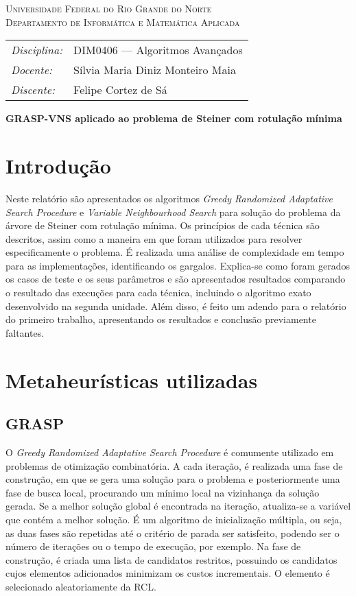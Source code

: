 \documentclass[12pt, a4paper]{article}
\begin{document}
\begin{center}
    \textsc{Universidade Federal do Rio Grande do Norte} \\
    \textsc{Departamento de Informática e Matemática Aplicada}
\end{center}

\bigskip

\begin{tabular}{@{}ll@{}}
    \emph{Disciplina:} & DIM0406 --- Algoritmos Avançados \\
    \emph{Docente:}    & Sílvia Maria Diniz Monteiro Maia \\
    \emph{Discente:}   & Felipe Cortez de Sá \\
\end{tabular}

\bigskip

\begin{center}
\large \textbf{GRASP-VNS aplicado ao problema de Steiner com rotulação mínima}
\end{center}

\section{Introdução}
Neste relatório são apresentados os algoritmos \emph{Greedy Randomized
Adaptative Search Procedure} e \emph{Variable Neighbourhood Search} para
solução do problema da árvore de Steiner com rotulação mínima. Os princípios de
cada técnica são descritos, assim como a maneira em que foram utilizados para
resolver especificamente o problema. É realizada uma análise de complexidade em
tempo para as implementações, identificando os gargalos. Explica-se como foram
gerados os casos de teste e os seus parâmetros e são apresentados resultados
comparando o resultado das execuções para cada técnica, incluindo o algoritmo
exato desenvolvido na segunda unidade. Além disso, é feito um adendo para o
relatório do primeiro trabalho, apresentando os resultados e conclusão
previamente faltantes.

\section{Metaheurísticas utilizadas}
\subsection{GRASP}
O \emph{Greedy Randomized Adaptative Search Procedure} é comumente utilizado em
problemas de otimização combinatória. A cada iteração, é realizada uma fase de
construção, em que se gera uma solução para o problema e posteriormente uma
fase de busca local, procurando um mínimo local na vizinhança da solução
gerada. Se a melhor solução global é encontrada na iteração, atualiza-se a
variável que contém a melhor solução. É um algoritmo de inicialização múltipla,
ou seja, as duas fases são repetidas até o critério de parada ser satisfeito,
podendo ser o número de iterações ou o tempo de execução, por exemplo. Na fase
de construção, é criada uma lista de candidatos restritos, possuindo os
candidatos cujos elementos adicionados minimizam os custos incrementais. O
elemento é selecionado aleatoriamente da RCL.
\end{document}
